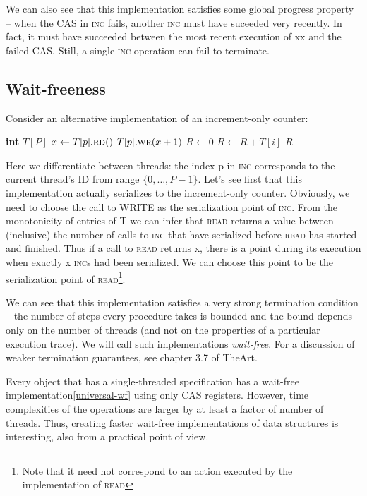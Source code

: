 \documentclass[a4paper,11pt]{article}
\newcommand{\fn}[1]{\textsc{#1}}
\begin{document}
We can also see that this implementation satisfies some global progress property -- when the CAS in \fn{inc} fails,
another \fn{inc} must have suceeded very recently. In fact, it must have succeeded between the most recent execution
of xx and the failed CAS. Still, a single \fn{inc} operation can fail to terminate.

\subsection{Wait-freeness}

Consider an alternative implementation of an increment-only counter:

\begin{algorithmic}[1]
\State \textbf{int} $T[P]$ 
	\State $x \gets T[p].\fn{rd}()$
	\State $T[p].\fn{wr}(x + 1)$
\EndFunction
{}
	\State $R \gets 0$
		\State $R \gets R + T[i]$
	\EndFor
	\State\Return $R$
\EndFunction
\end{algorithmic}

Here we differentiate between threads: the index p in \fn{inc} corresponds to the current thread's ID from range
$\{0, \ldots, P-1\}$. Let's see first that this implementation actually serializes to the increment-only counter.
Obviously, we need to choose the call to WRITE as the serialization point of \fn{inc}. From the monotonicity
of entries of T we can infer that \fn{read} returns a value between (inclusive) the number of calls to \fn{inc} that have
serialized before \fn{read} has started and finished. Thus if a call to \fn{read} returns x, there is a point during its
execution when exactly x \fn{inc}s had been serialized. We can choose this point to be the serialization point of
\fn{read}\footnote{Note that it need not correspond to an action executed by the implementation of \fn{read}}.

We can see that this implementation satisfies a very strong termination condition -- the number of steps every
procedure takes is bounded and the bound depends only on the number of threads (and not on the properties of
a particular execution trace). We will call such implementations \emph{wait-free}. For a discussion of weaker
termination guarantees, see chapter 3.7 of TheArt.

Every object that has a single-threaded specification has a wait-free implementation\ref{universal-wf} using
only CAS registers.
However, time complexities of the operations are larger by at least a factor of number of threads. 
Thus, creating faster wait-free implementations of data structures is interesting, also from a practical
point of view.
\end{document}

